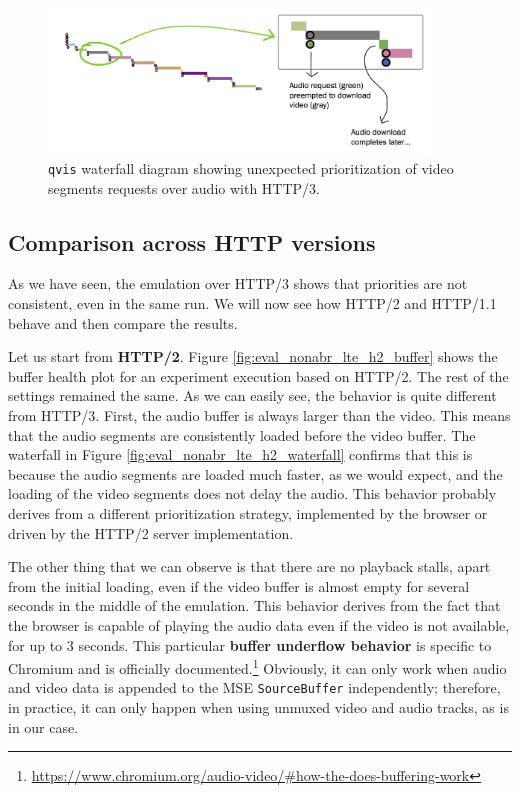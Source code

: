 \begin{figure}[h]
    \centering
    \includegraphics[width=0.9\textwidth]{res/eval_nonabr_qvis2.png}
    \caption{\texttt{qvis} waterfall diagram showing unexpected prioritization of video segments requests over audio with HTTP/3.}
    \label{fig:eval_noabr_qvis2}
\end{figure}

\subsection{Comparison across HTTP versions}
\label{sec:eval/non-abr/http-versions}

As we have seen, the emulation over HTTP/3 shows that priorities are not consistent, even in the same run. We will now see how HTTP/2 and HTTP/1.1 behave and then compare the results.

Let us start from \textbf{HTTP/2}. Figure \ref{fig:eval_nonabr_lte_h2_buffer} shows the buffer health plot for an experiment execution based on HTTP/2. The rest of the settings remained the same. As we can easily see, the behavior is quite different from HTTP/3. First, the audio buffer is always larger than the video. This means that the audio segments are consistently loaded before the video buffer. The waterfall in Figure \ref{fig:eval_nonabr_lte_h2_waterfall} confirms that this is because the audio segments are loaded much faster, as we would expect, and the loading of the video segments does not delay the audio. This behavior probably derives from a different prioritization strategy, implemented by the browser or driven by the HTTP/2 server implementation.

The other thing that we can observe is that there are no playback stalls, apart from the initial loading, even if the video buffer is almost empty for several seconds in the middle of the emulation. This behavior derives from the fact that the browser is capable of playing the audio data even if the video is not available, for up to 3 seconds. This particular \textbf{buffer underflow behavior} is specific to Chromium and is officially documented.\footnote{\url{https://www.chromium.org/audio-video/\#how-the-does-buffering-work}} Obviously, it can only work when audio and video data is appended to the MSE \texttt{SourceBuffer} independently; therefore, in practice, it can only happen when using unmuxed video and audio tracks, as is in our case.

